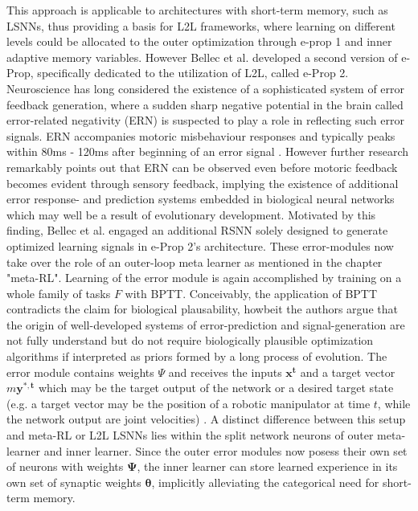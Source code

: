 \documentclass[letterpaper, 10 pt, conference]{ieeeconf}  %
\begin{document}
This approach is applicable to architectures with short-term memory, such as LSNNs, thus providing a basis for L2L frameworks, where 
learning on different levels could be allocated to the outer optimization through e-prop 1 and inner adaptive memory variables. 
\newline
However Bellec et al. developed a second version of e-Prop, specifically dedicated to the utilization of L2L, called e-Prop 2. 
Neuroscience has long considered the existence of a sophisticated system of error feedback generation, where a sudden sharp 
negative potential in the brain called error-related negativity (ERN) is suspected to play a role in reflecting such error signals.
ERN accompanies motoric misbehaviour responses and typically peaks within 80ms - 120ms after beginning of an error signal 
\cite{gehringErrorRelatedNegativity2018}\cite{dikmanErrorMonitoringReward2000}.
However further research remarkably points out that ERN can be observed even before motoric feedback becomes evident through 
sensory feedback, implying the existence of additional error response- and prediction systems embedded in biological neural networks
\cite{macleanUsingBrainPotentials2015}
which may well be a result of evolutionary development.
Motivated by this finding, Bellec et al.\cite{bellecBiologicallyInspiredAlternatives2019} engaged an additional 
RSNN solely designed to generate optimized learning signals in e-Prop 2's architecture.
These error-modules now take over the role of an outer-loop meta learner as mentioned in the chapter "meta-RL". Learning of the error module 
is again accomplished by training on a whole family of tasks $F$ with BPTT. Conceivably, the application of BPTT contradicts the claim for 
biological plausability, howbeit the authors argue that the origin of 
well-developed systems of error-prediction and signal-generation are not fully understand but do not require biologically plausible optimization 
algorithms if interpreted as priors formed by a long process of evolution. The error module contains weights $\Psi$ and receives the  
inputs $\mathbf{x^t}$ and a target vector $m\mathbf{y^{*,t}}$ which may be the target output of the network or a desired target state 
(e.g. a target vector may 
be the position of a robotic manipulator at time $t$, while the network output are joint velocities) \cite{bellecBiologicallyInspiredAlternatives2019}.
A distinct difference 
between this setup and meta-RL or L2L LSNNs lies within the split network neurons of outer meta-learner and inner learner. Since the outer error
modules now posess their own set of neurons with weights $\mathbf{\Psi}$, the inner learner can store learned experience in 
its own set of synaptic weights
$\mathbf{\theta}$, implicitly alleviating the categorical need for short-term memory. \newline
\end{document}
